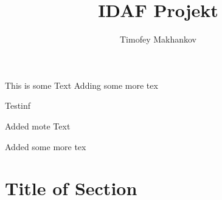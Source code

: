 \documentclass{article}
\author{Timofey Makhankov}
\title{IDAF Projekt}
\begin{document}
\maketitle
This is some Text
Adding some more tex

Testinf

Added mote Text

Added some more tex

\section{Title of Section}
\end{document}
